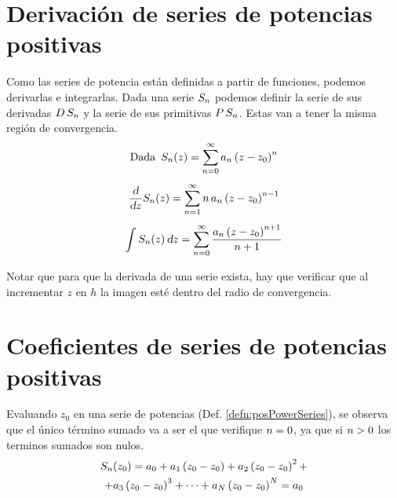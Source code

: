 \documentclass[a5paper,12pt,twoside]{book}
\begin{document}
\section{Derivación de series de potencias positivas}

Como las series de potencia están definidas a partir de funciones, podemos derivarlas e integrarlas.
Dada una serie $S_n$ podemos definir la serie de sus derivadas $D \, S_n$ y la serie de sus primitivas $P \, S_n$.
Estas van a tener la misma región de convergencia.
\begin{gather*}
    \textrm{Dada} \enspace S_n(z) = \sum_{n=0}^\infty a_n \left(z-z_0\right)^n
    \\[1ex]
    \frac{\textsl{d}}{\textsl{d} z} S_n(z) = \sum_{n=1}^\infty n \, a_n \left(z-z_0\right)^{n-1}
    \\[1ex]
    \int S_n(z) \, \textsl{d} z = \sum_{n=0}^\infty \frac{a_n \left(z-z_0\right)^{n+1}}{n+1}
\end{gather*}

Notar que para que la derivada de una serie exista, hay que verificar que al incrementar $z$ en $h$ la imagen esté dentro del radio de convergencia.


\section{Coeficientes de series de potencias positivas}

Evaluando $z_0$ en una serie de potencias (Def. \ref{defn:posPowerSeries}), se observa que el único término sumado va a ser el que verifique $n=0$, ya que si $n>0$ los terminos sumados son nulos.
\begin{multline*}
    S_n(z_0) = a_0 + a_1 \left(z_0-z_0\right) + a_2 \left(z_0-z_0\right)^2 +
    \\
    + a_3 \left(z_0-z_0\right)^3 + \dots + a_N \left(z_0-z_0\right)^N = a_0
\end{multline*}
\end{document}
